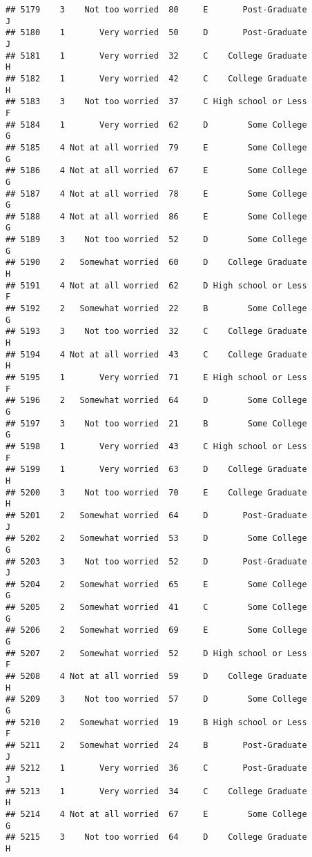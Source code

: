 \documentclass[
]{article}
\begin{document}
\begin{verbatim}
## 5179    3    Not too worried  80     E       Post-Graduate         J
## 5180    1       Very worried  50     D       Post-Graduate         J
## 5181    1       Very worried  32     C    College Graduate         H
## 5182    1       Very worried  42     C    College Graduate         H
## 5183    3    Not too worried  37     C High school or Less         F
## 5184    1       Very worried  62     D        Some College         G
## 5185    4 Not at all worried  79     E        Some College         G
## 5186    4 Not at all worried  67     E        Some College         G
## 5187    4 Not at all worried  78     E        Some College         G
## 5188    4 Not at all worried  86     E        Some College         G
## 5189    3    Not too worried  52     D        Some College         G
## 5190    2   Somewhat worried  60     D    College Graduate         H
## 5191    4 Not at all worried  62     D High school or Less         F
## 5192    2   Somewhat worried  22     B        Some College         G
## 5193    3    Not too worried  32     C    College Graduate         H
## 5194    4 Not at all worried  43     C    College Graduate         H
## 5195    1       Very worried  71     E High school or Less         F
## 5196    2   Somewhat worried  64     D        Some College         G
## 5197    3    Not too worried  21     B        Some College         G
## 5198    1       Very worried  43     C High school or Less         F
## 5199    1       Very worried  63     D    College Graduate         H
## 5200    3    Not too worried  70     E    College Graduate         H
## 5201    2   Somewhat worried  64     D       Post-Graduate         J
## 5202    2   Somewhat worried  53     D        Some College         G
## 5203    3    Not too worried  52     D       Post-Graduate         J
## 5204    2   Somewhat worried  65     E        Some College         G
## 5205    2   Somewhat worried  41     C        Some College         G
## 5206    2   Somewhat worried  69     E        Some College         G
## 5207    2   Somewhat worried  52     D High school or Less         F
## 5208    4 Not at all worried  59     D    College Graduate         H
## 5209    3    Not too worried  57     D        Some College         G
## 5210    2   Somewhat worried  19     B High school or Less         F
## 5211    2   Somewhat worried  24     B       Post-Graduate         J
## 5212    1       Very worried  36     C       Post-Graduate         J
## 5213    1       Very worried  34     C    College Graduate         H
## 5214    4 Not at all worried  67     E        Some College         G
## 5215    3    Not too worried  64     D    College Graduate         H

\end{verbatim}
\end{document}
